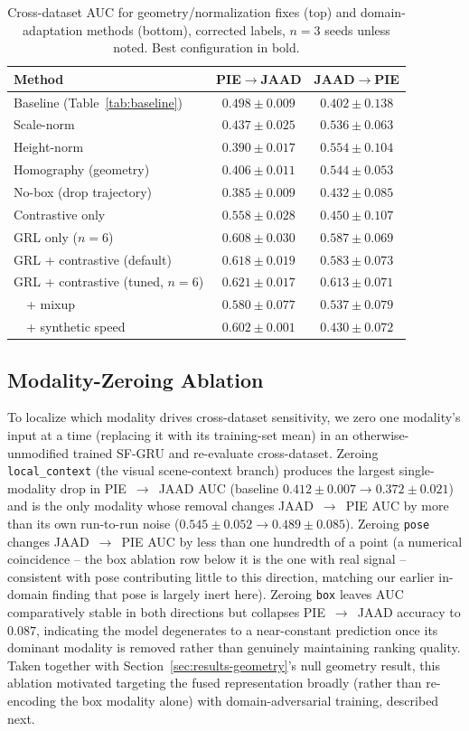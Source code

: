 \begin{table}[t]
\centering
\caption{Cross-dataset AUC for geometry/normalization fixes (top) and
domain-adaptation methods (bottom), corrected labels, $n=3$ seeds
unless noted. Best configuration in bold.}
\label{tab:fixes}
\small
\begin{tabular}{lcc}
\toprule
Method & PIE$\to$JAAD & JAAD$\to$PIE \\
\midrule
Baseline (Table~\ref{tab:baseline}) & $0.498\pm0.009$ & $0.402\pm0.138$ \\
Scale-norm & $0.437\pm0.025$ & $0.536\pm0.063$ \\
Height-norm & $0.390\pm0.017$ & $0.554\pm0.104$ \\
Homography (geometry) & $0.406\pm0.011$ & $0.544\pm0.053$ \\
No-box (drop trajectory) & $0.385\pm0.009$ & $0.432\pm0.085$ \\
\midrule
Contrastive only & $0.558\pm0.028$ & $0.450\pm0.107$ \\
GRL only ($n{=}6$) & $0.608\pm0.030$ & $0.587\pm0.069$ \\
GRL + contrastive (default) & $0.618\pm0.019$ & $0.583\pm0.073$ \\
GRL + contrastive (tuned, $n{=}6$) & $\mathbf{0.621\pm0.017}$ & $\mathbf{0.613\pm0.071}$ \\
\ \ + mixup & $0.580\pm0.077$ & $0.537\pm0.079$ \\
\ \ + synthetic speed & $0.602\pm0.001$ & $0.430\pm0.072$ \\
\bottomrule
\end{tabular}
\end{table}

\subsection{Modality-Zeroing Ablation}
\label{sec:results-ablation}

To localize which modality drives cross-dataset sensitivity, we
zero one modality's input at a time (replacing it with its
training-set mean) in an otherwise-unmodified trained SF-GRU and
re-evaluate cross-dataset. Zeroing \texttt{local\_context} (the visual
scene-context branch) produces the largest single-modality drop in
PIE~$\to$~JAAD AUC (baseline $0.412\pm0.007 \to 0.372\pm0.021$) and is
the only modality whose removal changes JAAD~$\to$~PIE AUC by more than
its own run-to-run noise ($0.545\pm0.052 \to 0.489\pm0.085$). Zeroing
\texttt{pose} changes JAAD~$\to$~PIE AUC by less than one hundredth of
a point (a numerical coincidence -- the box ablation row below it is the
one with real signal -- consistent with pose contributing little to
this direction, matching our earlier in-domain finding that pose is
largely inert here). Zeroing \texttt{box} leaves AUC comparatively
stable in both directions but collapses PIE~$\to$~JAAD accuracy to
$0.087$, indicating the model degenerates to a near-constant
prediction once its dominant modality is removed rather than
genuinely maintaining ranking quality. Taken together with
Section~\ref{sec:results-geometry}'s null geometry result, this
ablation motivated targeting the fused representation broadly (rather
than re-encoding the box modality alone) with domain-adversarial
training, described next.

